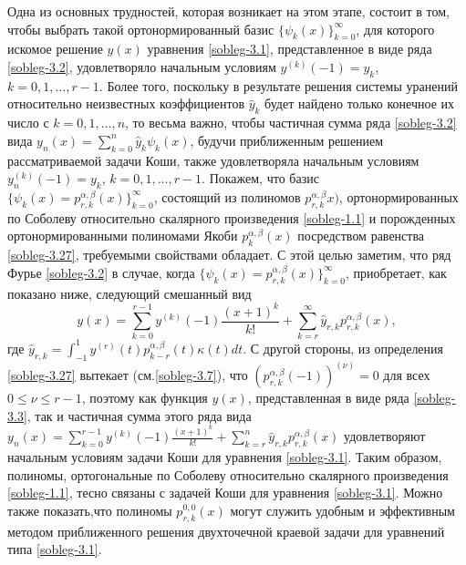 Одна из основных трудностей, которая возникает на этом этапе, состоит в том, чтобы
выбрать такой ортонормированный базис $\{\psi_k(x)\}_{k=0}^\infty$, для которого искомое решение $y(x)$ уравнения \eqref{sobleg-3.1}, представленное в виде ряда  \eqref{sobleg-3.2}, удовлетворяло начальным условиям $y^{(k)}(-1)=y_k$, $k=0,1,\ldots,r-1$. Более того, поскольку в результате решения системы уранений относительно неизвестных коэффициентов $\hat y_k$  будет найдено только конечное их число с $k=0,1,\ldots, n$, то весьма важно, чтобы частичная сумма ряда \eqref{sobleg-3.2} вида
$ y_n(x)=\sum_{k=0}^n\hat y_k\psi_k(x)$, будучи приближенным решением рассматриваемой задачи Коши, также удовлетворяла  начальным условиям $y_n^{(k)}(-1)=y_k$, $k=0,1,\ldots,r-1$. Покажем, что  базис $\{\psi_k(x)=p_{r,k}^{\alpha,\beta}(x)\}_{k=0}^\infty$, состоящий из полиномов
$p_{r,k}^{\alpha,\beta}x)$, ортонормированных по Соболеву относительно скалярного произведения \eqref{sobleg-1.1} и порожденных ортонормированными полиномами Якоби $p_k^{\alpha,\beta}(x)$  посредством равенства \eqref{sobleg-3.27}, требуемыми свойствами обладает.
   С этой целью заметим, что ряд Фурье \eqref{sobleg-3.2} в случае, когда $\{\psi_k(x)=p_{r,k}^{\alpha,\beta}(x)\}_{k=0}^\infty$, приобретает, как показано ниже, следующий смешанный вид
   \begin{equation}\label{sobleg-3.3}
y(x)= \sum_{k=0}^{r-1} y^{(k)}(-1)\frac{(x+1)^k}{k!}+ \sum_{k=r}^\infty \hat y_{r,k}p_{r,k}^{\alpha,\beta}(x),
\end{equation}
где  $ \hat y_{r,k}=\int_{-1}^1 y^{(r)}(t)p_{k-r}^{\alpha,\beta}(t)\kappa(t)dt$.
С другой стороны, из определения \eqref{sobleg-3.27} вытекает (см.\eqref{sobleg-3.7}), что $(p_{r,k}^{\alpha,\beta}(-1))^{(\nu)}=0$ для всех $0\le\nu\le r-1$, поэтому как функция $y(x)$, представленная в виде ряда \eqref{sobleg-3.3}, так и частичная  сумма этого ряда вида
$
y_n(x)= \sum_{k=0}^{r-1} y^{(k)}(-1)\frac{(x+1)^k}{k!}+ \sum_{k=r}^n \hat y_{r,k}p_{r,k}^{\alpha,\beta}(x)
$
удовлетворяют начальным условиям задачи Коши для уравнения \eqref{sobleg-3.1}.
Таким образом, полиномы, ортогональные по Соболеву относительно скалярного произведения \eqref{sobleg-1.1}, тесно связаны с задачей Коши для уравнения \eqref{sobleg-3.1}. Можно также показать,что полиномы $p_{r,k}^{0,0}(x)$ могут служить удобным и эффективным методом приближенного решения двухточечной краевой задачи для уравнений типа \eqref{sobleg-3.1}.

